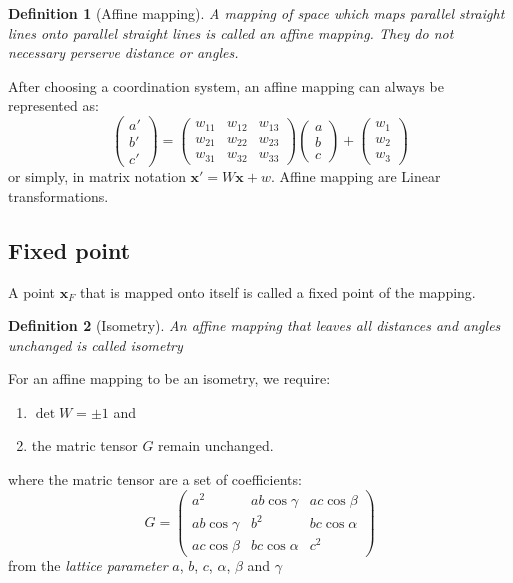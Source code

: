 \documentclass{amsart}
\newcommand{\bfx}{\mathbf{x}}
\newtheorem{definition}{Definition}
\begin{document}
\vspace{10pt}

\begin{definition}
    [Affine mapping]
    A mapping of space which maps parallel straight lines onto parallel straight lines is called an affine mapping. They do not necessary perserve 
    distance or angles.
\end{definition}

After choosing a coordination system, an affine mapping can always be represented as:
\begin{equation}
    \left( \begin{matrix}
        a'\\b'\\c'
    \end{matrix} \right)  = \left( \begin{matrix}
        w_{11} & w_{12} & w_{13} \\
        w_{21} & w_{22} & w_{23} \\
        w_{31} & w_{32} & w_{33}
    \end{matrix} \right) \left( \begin{matrix}
        a\\b\\c
    \end{matrix} \right)+ \left( \begin{matrix}
        w_1\\w_2\\w_3
    \end{matrix} \right)
\end{equation}
or simply, in matrix notation $\bfx' = W\bfx + w$. Affine mapping are Linear transformations.

\subsection*{Fixed point} A point $\bfx_F$ that is mapped onto itself is called a fixed point of the mapping.

\vspace{10pt}

\begin{definition}
    [Isometry]
    An affine mapping that leaves all distances and angles unchanged is called \emph{isometry}
\end{definition}
For an affine mapping to be an isometry, we require: 
\begin{enumerate}
    \item $\det W = \pm 1$ and 
    \item the matric tensor $G$ remain unchanged.
\end{enumerate}
where the matric tensor are a set of coefficients:
\begin{equation}
    G = \left(\begin{matrix}
        a^2 & ab\cos\gamma & ac\cos\beta \\
        ab\cos\gamma & b^2 & bc\cos\alpha \\
        ac\cos\beta & bc\cos\alpha & c^2 
    \end{matrix}\right)
\end{equation}
from the \emph{lattice parameter} $a$, $b$, $c$, $\alpha$, $\beta$ and $\gamma$
\end{document}
